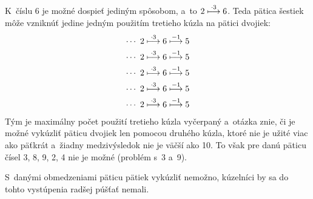 {K~číslu 6 je možné dospieť jediným spôsobom, a~to $2 \buildrel \cdot3 \over \longmapsto 6$.
Teda pätica šestiek môže vzniknúť jedine jedným použitím tretieho kúzla na pätici dvojiek:
$$\aligned
\cdots\ 2 \buildrel \cdot3 \over \longmapsto 6 \buildrel -1 \over \longmapsto 5 \\
\cdots\ 2 \buildrel \cdot3 \over \longmapsto 6 \buildrel -1 \over \longmapsto 5 \\
\cdots\ 2 \buildrel \cdot3 \over \longmapsto 6 \buildrel -1 \over \longmapsto 5 \\
\cdots\ 2 \buildrel \cdot3 \over \longmapsto 6 \buildrel -1 \over \longmapsto 5 \\
\cdots\ 2 \buildrel \cdot3 \over \longmapsto 6 \buildrel -1 \over \longmapsto 5 \\
\endaligned
$$
Tým je maximálny počet použití tretieho kúzla vyčerpaný a~otázka znie, či je možné vykúzliť päticu dvojiek len pomocou druhého kúzla, ktoré nie je užité viac ako päťkrát a~žiadny medzivýsledok nie je väčší ako 10.
To však pre danú päticu čísel 3, 8, 9, 2, 4 nie je možné (problém s~3 a~9).

S~danými obmedzeniami päticu pätiek vykúzliť nemožno, kúzelníci by sa do tohto vystúpenia radšej púšťať nemali.}

